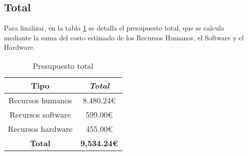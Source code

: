 \subsection{Total}

Para finalizar, en la tabla \ref{tab:total-budget} se detalla el presupuesto total, que se calcula mediante la suma del costo estimado de los Recursos Humanos, el Software y el Hardware.

\begin{table}[htp]
	\centering
	\caption{Presupuesto total}\label{tab:total-budget}
	\begin{tabular}{cc}
		\toprule
    	\textbf{Tipo} 		& 	\emph{Total}\\
    	\midrule
		Recursos humanos	&	8,480.24€\\
		Recursos software	&	599.00€\\
		Recursos hardware	&	455.00€\\
		\textbf{Total}		&	\textbf{9,534.24€}\\
    	\bottomrule
    \end{tabular}
\end{table}